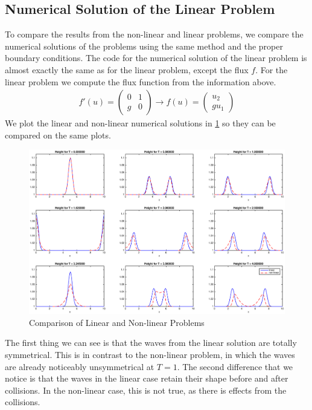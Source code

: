 \subsection{Numerical Solution of the Linear Problem}
To compare the results from the non-linear and linear problems, we compare the numerical solutions of the problems using the same method and the proper boundary conditions. The code for the numerical solution of the linear problem is almost exactly the same as for the linear problem, except the flux $f$. For the linear problem we compute the flux function from the information above. 
\begin{align*}
f'(u) = \begin{pmatrix}
0 & 1 \\
g & 0
\end{pmatrix} \rightarrow 
f(u) = \begin{pmatrix}
u_2 \\
gu_1
\end{pmatrix}
\end{align*}
We plot the linear and non-linear numerical solutions in \ref{compare} so they can be compared on the same plots. 
\begin{figure}
\begin{center}
\includegraphics[scale=0.4]{222comparison.eps}
\caption{Comparison of Linear and Non-linear Problems}
\label{compare}
\end{center}
\end{figure}
The first thing we can see is that the waves from the linear solution are totally symmetrical. This is in contrast to the non-linear problem, in which the waves are already noticeably unsymmetrical at $T=1$. The second difference that we notice is that the waves in the linear case retain their shape before and after collisions. In the non-linear case, this is not true, as there is effects from the collisions. 